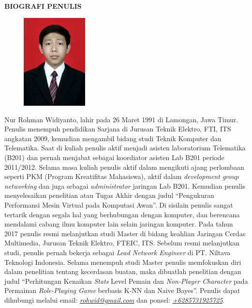 \begin{center}
\large\textbf{BIOGRAFI PENULIS}
\end{center}
\vspace{1ex}

\begin{figure}
	\centering
	\vspace{-3ex}	
	\includegraphics[width=0.3\textwidth]{img/aku.jpg}
	\vspace{-4ex}
\end{figure}

\noindent Nur Rohman Widiyanto, lahir pada 26 Maret 1991 di Lamongan, Jawa Timur.
Penulis menempuh pendidikan Sarjana di Jurusan Teknik Elektro, FTI, ITS angkatan 2009, kemudian mengambil bidang studi Teknik Komputer dan Telematika. Saat di kuliah penulis aktif menjadi asisten laboratorium Telematika (B201) dan pernah menjabat sebagai koordiator asisten Lab B201 periode 2011/2012. Selama masa kuliah penulis aktif dalam mengikuti ajang perlombaan seperti PKM (Program Kreatifitas Mahasiswa), aktif dalam \textit{development group networking} dan juga sebagai \textit{administrator} jaringan Lab B201. Kemudian penulis menyelesaikan penelitian atau Tugas Akhir dengan judul ``Pengukuran Performansi Mesin Virtual pada Komputasi Awan''. Di sisilain penulis sangat tertarik dengan segala hal yang berhubungan dengan komputer, dan berencana mendalami cabang ilmu komputer lain selain jaringan komputer. Pada tahun 2017 penulis resmi melanjutkan studi Master di bidang keahlian Jaringan Cerdas Multimedia, Jurusan Teknik Elektro, FTEIC, ITS. Sebelum resmi melanjutkan studi, penulis pernah bekerja sebagai \textit{Lead Network Engineer} di PT. Niltava Teknologi Indonesia. Selama menempuh studi Master penulis memfokuskan diri dalam penelitian tentang kecerdasan buatan, maka dibuatlah penelitian dengan judul ``Perhitungan Kenaikan \textit{Stats} Level Pemain dan \textit{Non-Player Character} pada Permainan \textit{Role-Playing Game} berbasis K-NN dan Naive Bayes''. Penulis dapat dihubungi melalui email: \underline{\textit{rohwid@gmail.com}} dan ponsel: \underline{\textit{+6285731925725}}.